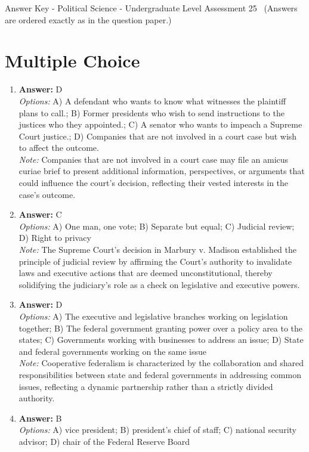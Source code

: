 \documentclass[12pt]{article}
\begin{document}
\begin{center}
Answer Key - Political Science - Undergraduate Level Assessment 25 \
\small (Answers are ordered exactly as in the question paper.)
\end{center}

\section*{Multiple Choice}
\begin{enumerate}[label=\arabic*.]
\item \textbf{Answer:} D
\\ \textit{Options:} A) A defendant who wants to know what witnesses the plaintiff plans to call.; B) Former presidents who wish to send instructions to the justices who they appointed.; C) A senator who wants to impeach a Supreme Court justice.; D) Companies that are not involved in a court case but wish to affect the outcome.
\\ \textit{Note:} Companies that are not involved in a court case may file an amicus curiae brief to present additional information, perspectives, or arguments that could influence the court's decision, reflecting their vested interests in the case's outcome.
\item \textbf{Answer:} C
\\ \textit{Options:} A) One man, one vote; B) Separate but equal; C) Judicial review; D) Right to privacy
\\ \textit{Note:} The Supreme Court's decision in Marbury v. Madison established the principle of judicial review by affirming the Court's authority to invalidate laws and executive actions that are deemed unconstitutional, thereby solidifying the judiciary's role as a check on legislative and executive powers.
\item \textbf{Answer:} D
\\ \textit{Options:} A) The executive and legislative branches working on legislation together; B) The federal government granting power over a policy area to the states; C) Governments working with businesses to address an issue; D) State and federal governments working on the same issue
\\ \textit{Note:} Cooperative federalism is characterized by the collaboration and shared responsibilities between state and federal governments in addressing common issues, reflecting a dynamic partnership rather than a strictly divided authority.
\item \textbf{Answer:} B
\\ \textit{Options:} A) vice president; B) president's chief of staff; C) national security advisor; D) chair of the Federal Reserve Board

\end{enumerate}
\end{document}
